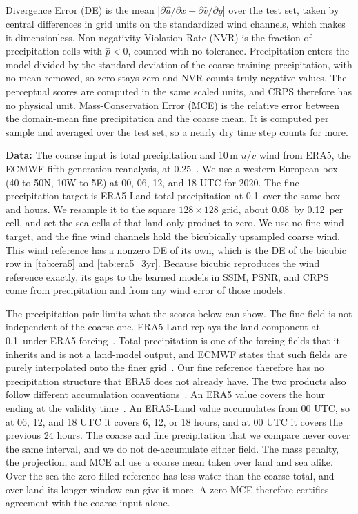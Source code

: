 \documentclass[sigconf,nonacm]{acmart}
\begin{document}
Divergence Error (DE) is the mean $|\partial \hat u/\partial x + \partial \hat v/\partial y|$ over the test set, taken by central differences in grid units on the standardized wind channels, which makes it dimensionless. Non-negativity Violation Rate (NVR) is the fraction of precipitation cells with $\hat p < 0$, counted with no tolerance. Precipitation enters the model divided by the standard deviation of the coarse training precipitation, with no mean removed, so zero stays zero and NVR counts truly negative values. The perceptual scores are computed in the same scaled units, and CRPS therefore has no physical unit. Mass-Conservation Error (MCE) is the relative error between the domain-mean fine precipitation and the coarse mean. It is computed per sample and averaged over the test set, so a nearly dry time step counts for more.

\textbf{Data:} The coarse input is total precipitation and 10\,m $u$/$v$ wind from ERA5, the ECMWF fifth-generation reanalysis, at 0.25\textdegree~\citep{hersbach2020era5}. We use a western European box (40 to 50\textdegree N, 10\textdegree W to 5\textdegree E) at 00, 06, 12, and 18 UTC for 2020. The fine precipitation target is ERA5-Land total precipitation at 0.1\textdegree\ over the same box and hours. We resample it to the square $128 \times 128$ grid, about 0.08\textdegree\ by 0.12\textdegree\ per cell, and set the sea cells of that land-only product to zero. We use no fine wind target, and the fine wind channels hold the bicubically upsampled coarse wind. This wind reference has a nonzero DE of its own, which is the DE of the bicubic row in \cref{tab:era5} and \cref{tab:era5_3yr}. Because bicubic reproduces the wind reference exactly, its gaps to the learned models in SSIM, PSNR, and CRPS come from precipitation and from any wind error of those models.

The precipitation pair limits what the scores below can show. The fine field is not independent of the coarse one. ERA5-Land replays the land component at 0.1\textdegree\ under ERA5 forcing~\citep{munozsabater2021era5land}. Total precipitation is one of the forcing fields that it inherits and is not a land-model output, and ECMWF states that such fields are purely interpolated onto the finer grid~\citep{ecmwf2025era5land}. Our fine reference therefore has no precipitation structure that ERA5 does not already have. The two products also follow different accumulation conventions~\citep{ecmwf2025era5land}. An ERA5 value covers the hour ending at the validity time~\citep{ecmwf2026era5}. An ERA5-Land value accumulates from 00 UTC, so at 06, 12, and 18 UTC it covers 6, 12, or 18 hours, and at 00 UTC it covers the previous 24 hours. The coarse and fine precipitation that we compare never cover the same interval, and we do not de-accumulate either field. The mass penalty, the projection, and MCE all use a coarse mean taken over land and sea alike. Over the sea the zero-filled reference has less water than the coarse total, and over land its longer window can give it more. A zero MCE therefore certifies agreement with the coarse input alone.
\end{document}
